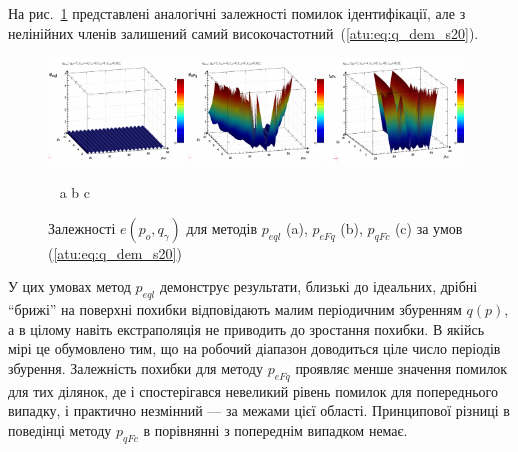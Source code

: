 На рис.~\ref{atu:f:qsl_pe_po_qg_s20} представлені аналогічні залежності
помилок ідентифікації, але з нелінійних членів залишений самий
високочастотний~(\ref{atu:eq:q_dem_s20}).

\begin{figure}[htb!]
  \begin{center}
    \includegraphics[width=0.32\textwidth]{p/qls_pe-p_po_qg_eql_s20.png}
    \hfill
    \includegraphics[width=0.32\textwidth]{p/qls_pe-p_po_qg_eFq_s20.png}
    \hfill
    \includegraphics[width=0.32\textwidth]{p/qls_pe-p_po_qg_eFc_s20.png}
  \end{center}
  \vspace{-1.0ex}
  \begin{center}
    ~ \hfill a \hfill\hfill b \hfill\hfill c \hfill ~
  \end{center}
  \vspace{-1.5ex}
  \caption{Залежності $e(p_o,q_\gamma)$ для методів $p_{eql}$ (a), $p_{eFq}$ (b), $p_{qFc}$ (c) за умов (\ref{atu:eq:q_dem_s20})}
  \label{atu:f:qsl_pe_po_qg_s20}
\end{figure}

У цих умовах метод
$p_{eql}$ демонструє результати, близькі до ідеальних, дрібні
``брижі'' на поверхні похибки відповідають малим періодичним
збуренням
$q(p)$, а в цілому навіть екстраполяція не приводить до зростання
похибки. В якійсь мірі це обумовлено тим, що на робочий діапазон
доводиться ціле число періодів збурення. Залежність похибки
для методу
$p_{eFq}$ проявляє менше значення помилок для тих ділянок, де
і спостерігався невеликий рівень помилок для попереднього
випадку, і практично незмінний --- за межами цієї
області. Принципової різниці в поведінці методу
$p_{qFc}$ в порівнянні з попереднім випадком немає.

